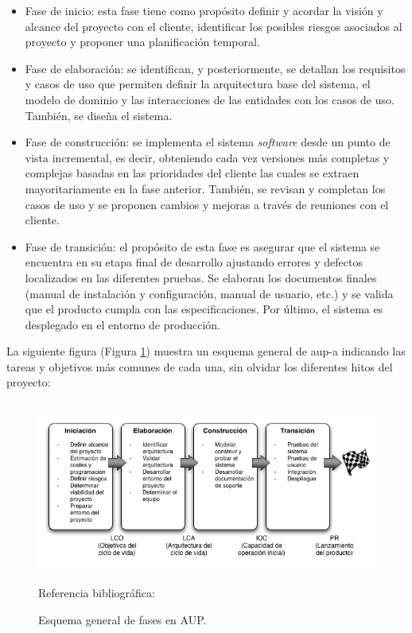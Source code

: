 \documentclass[12pt,a4paper, twoside]{report}
\begin{document}
	\begin{itemize}
		\item Fase de inicio: esta fase tiene como propósito definir y acordar la visión y alcance del proyecto con el cliente, identificar los posibles riesgos asociados al proyecto y proponer una planificación temporal.
		\item Fase de elaboración: se identifican, y posteriormente, se detallan los requisitos y casos de uso que permiten definir la arquitectura base del sistema, el modelo de dominio y las interacciones de las entidades con los casos de uso. También, se diseña el sistema.
		\item Fase de construcción: se implementa el sistema \textit{software} desde un punto de vista incremental, es decir, obteniendo cada vez versiones más completas y complejas basadas en las prioridades del cliente las cuales se extraen mayoritariamente en la fase anterior. También, se revisan y completan los casos de uso y se proponen cambios y mejoras a través de reuniones con el cliente.
		\item Fase de transición: el propósito de esta fase es asegurar que el sistema se encuentra en su etapa final de desarrollo ajustando errores y defectos localizados en las diferentes pruebas. Se elaboran los documentos finales (manual de instalación y configuración, manual de usuario, etc.) y se valida que el producto cumpla con las especificaciones. Por último, el sistema es desplegado en el entorno de producción.
	\end{itemize}
	
	La siguiente figura (Figura \ref{fig:plannig-aup-scheme}) muestra un esquema general de \gls{aup-a} indicando las tareas y objetivos más comunes de cada una, sin olvidar los diferentes hitos del proyecto:
	
	\begin{figure}[!ht]   
		\caption{Esquema general de fases en AUP.} 
		\begin{center} 
	 		\includegraphics[width=15cm,height=6cm]{Images/planning/aup} \\
			\label{fig:plannig-aup-scheme} 
			Referencia bibliográfica: \cite{torrecilla:PUA}
		\end{center}  
	\end{figure}
	
\end{document}
